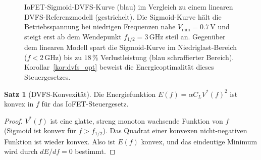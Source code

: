 ﻿\documentclass[a4paper,12pt]{scrreprt}
\theoremstyle{definition}
\newtheorem{satz}{Satz}[chapter]
\begin{document}
	\begin{figure}[H]
		\centering
		\caption{IoFET-Sigmoid-DVFS-Kurve (blau) im Vergleich zu einem linearen
			DVFS-Referenzmodell (gestrichelt). Die Sigmoid-Kurve hält die
			Betriebsspannung bei niedrigen Frequenzen nahe $V_{\min} = 0.7\,\text{V}$
			und steigt erst ab dem Wendepunkt $f_{1/2} = 3\,\text{GHz}$ steil an.
			Gegenüber dem linearen Modell spart die Sigmoid-Kurve im Niedriglast-Bereich
			($f < 2\,\text{GHz}$) bis zu $18\,\%$ Verlustleistung (blau schraffierter
			Bereich). Korollar~\ref{kor:dvfs_opt} beweist die Energieoptimalität dieses
			Steuergesetzes.}
		\label{fig:dvfs-sigmoid}
	\end{figure}

	\begin{satz}[DVFS-Konvexität]\label{satz:dvfs_convex}
		Die Energiefunktion $E(f) = \alpha C_L V^*(f)^2$ ist konvex in $f$
		für das IoFET-Steuergesetz.
	\end{satz}

	\begin{proof}
		$V^*(f)$ ist eine glatte, streng monoton wachsende Funktion von $f$
		(Sigmoid ist konvex für $f > f_{1/2}$). Das Quadrat einer konvexen
		nicht-negativen Funktion ist wieder konvex. Also ist $E(f)$ konvex,
		und das eindeutige Minimum wird durch $dE/df = 0$ bestimmt.
	\end{proof}
\end{document}
